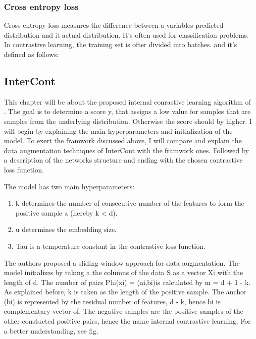 \subsubsection*{Cross entropy loss}
Cross entropy loss measures the difference between a variables predicted distribution and it actual distribution.
It's often used for classification problems.
In contrastive learning, the training set is ofter divided into batches.
and it's defined as follows: 


\subsection{InterCont}
This chapter will be about the proposed internal conrastive learning algorithm of \citeauthor{shenkar2022anomaly}.
The goal is to determine a score y, that assigns a low value for samples that are samples from the underlying distribution.
Otherwise the score should by higher.
I will begin by explaining the main hyperparameters and initialization of the model.
To exert the framwork discussed above, I will compare and explain the data augmentation techniques of InterCont with the framwork ones.
Followed by a description of the networks structure and ending with the chosen contrastive loss function.


The model has two main hyperparameters: 
\begin{enumerate}
    \item k determines the number of consecutive number of the features to form the positive sample a (hereby k < d).
    \item u determines the embedding size.
    \item Tau is a temperature constant in the contrastive loss function.
\end{enumerate}


The authors proposed a sliding window approach for data augmentation. 
The model initializes by taking a the columns of the data S as a vector Xi with the length of d.  
The number of pairs Phi(xi) = {(ai,bi)}is calculated by m = d + 1 - k.
As explained before, k is taken as the length of the positive sample.
The anchor (bi) is represented by the residual number of features, d - k, hence bi is complementary vector of.
The negative samples are the positive samples of the other constucted positive pairs, hence the name internal contrastive learning.
For a better understanding, see fig.


